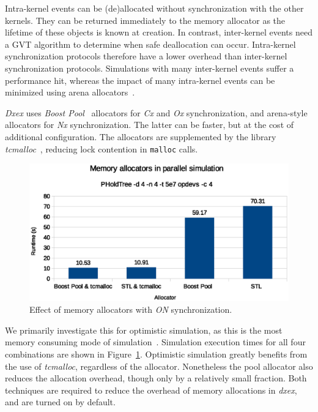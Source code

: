 Intra-kernel events can be (de)allocated without synchronization with the other kernels. 
They can be returned immediately to the memory allocator as the lifetime of these objects is known at creation. 
In contrast, inter-kernel events need a GVT algorithm to determine when safe deallocation can occur.
Intra-kernel synchronization protocols therefore have a lower overhead than inter-kernel synchronization protocols.
Simulations with many inter-kernel events suffer a performance hit, whereas the impact of many intra-kernel events can be minimized using arena allocators~\cite{Arena}.

\textit{Dxex} uses \textit{Boost Pool}~\cite{boostpool} allocators for \textit{Cx} and \textit{Ox} synchronization, and arena-style allocators for \textit{Nx} synchronization.
The latter can be faster, but at the cost of additional configuration.
The allocators are supplemented by the library \textit{tcmalloc}~\cite{tcmalloc}, reducing lock contention in \texttt{malloc} calls.

\begin{figure}
    \center
    \includegraphics[width=\columnwidth]{fig/memory_allocators_parallel.eps}
    \caption{Effect of memory allocators with \textit{ON} synchronization.}
    \label{fig:memallocators_parallel}
\end{figure}

We primarily investigate this for optimistic simulation, as this is the most memory consuming mode of simulation~\cite{FujimotoBook}.
Simulation execution times for all four combinations are shown in Figure~\ref{fig:memallocators_parallel}.
Optimistic simulation greatly benefits from the use of \textit{tcmalloc}, regardless of the allocator.
Nonetheless the pool allocator also reduces the allocation overhead, though only by a relatively small fraction.
Both techniques are required to reduce the overhead of memory allocations in \textit{dxex}, and are turned on by default.

